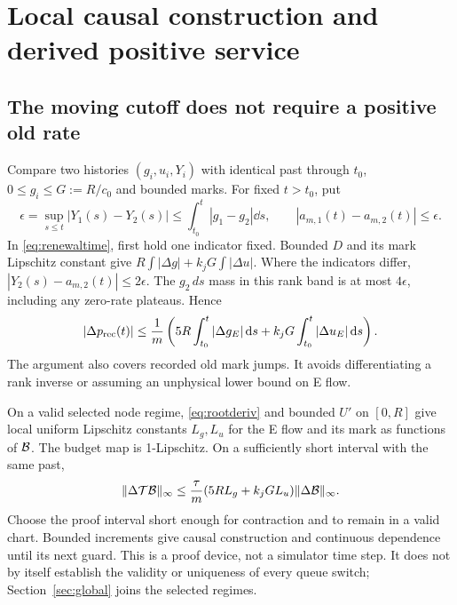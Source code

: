 \section{Local causal construction and derived positive service}
\label{sec:local}
\subsection{The moving cutoff does not require a positive old rate}
Compare two histories $(g_i,u_i,Y_i)$ with identical past through $t_0$,
$0\leq g_i\leq G:=R/c_0$ and bounded marks. For fixed $t>t_0$, put
\begin{equation}
 \epsilon=\sup_{s\leq t}|Y_1(s)-Y_2(s)|
 \leq\int_{t_0}^t|g_1-g_2|\dd s,\qquad
 |a_{m,1}(t)-a_{m,2}(t)|\leq\epsilon. \label{eq:cutoffdiff}
\end{equation}
In \eqref{eq:renewaltime}, first hold one indicator fixed. Bounded $D$
and its mark Lipschitz constant give
$R\int|\Delta g|+k_jG\int|\Delta u|$. Where the indicators differ,
$|Y_2(s)-a_{m,2}(t)|\leq2\epsilon$. The $g_2\,ds$ mass in this rank
band is at most $4\epsilon$, including any zero-rate plateaus. Hence
\begin{equation}
 |\Delta p_{\mathrm{rec}}(t)|\leq\frac1m\left(
 5R\int_{t_0}^t|\Delta g_E|\,\mathrm d s+
 k_jG\int_{t_0}^t|\Delta u_E|\,\mathrm d s\right). \label{eq:volterra}
\end{equation}
The argument also covers recorded old mark jumps. It avoids differentiating
a rank inverse or assuming an unphysical lower bound on E flow.

On a valid selected node regime, \eqref{eq:rootderiv} and bounded $U'$
on $[0,R]$ give local uniform Lipschitz constants $L_g,L_u$ for the E
flow and its mark as functions of $\mathcal B$. The budget map is 1-Lipschitz.
On a sufficiently short interval with the same past,
\begin{equation}
 \|\Delta\mathcal T\mathcal B\|_\infty
 \leq\frac{\tau}{m}(5RL_g+k_jGL_u)\|\Delta\mathcal B\|_\infty.
 \label{eq:contraction}
\end{equation}
Choose the proof interval short enough for contraction and to remain in
a valid chart. Bounded increments give causal construction and continuous
dependence until its next guard. This is a proof device, not a simulator
time step. It does not by itself establish the validity or uniqueness of
every queue switch; Section~\ref{sec:global} joins the selected regimes.

